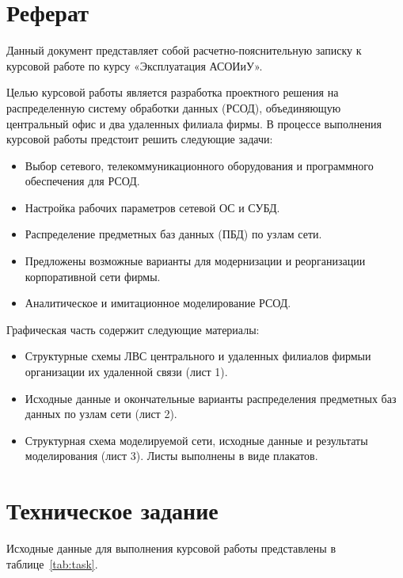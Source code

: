 \documentclass[russian,utf8,emptystyle]{eskdtext}
\begin{document}
\maketitle
%

\section{Реферат}
Данный документ представляет собой расчетно-пояснительную записку к курсовой работе по курсу «Эксплуатация АСОИиУ».

Целью курсовой работы является разработка проектного решения на распределенную систему обработки данных (РСОД), объединяющую центральный офис и два удаленных филиала фирмы. В процессе выполнения курсовой работы предстоит решить следующие задачи:
\begin{itemize}[label=-]
\item Выбор сетевого, телекоммуникационного оборудования и программного обеспечения для РСОД.
\item Настройка рабочих параметров сетевой ОС и СУБД.
\item Распределение предметных баз данных (ПБД) по узлам сети.
\item Предложены возможные варианты для модернизации и реорганизации корпоративной сети фирмы.
\item Аналитическое и имитационное моделирование РСОД.
\end{itemize}

Графическая часть содержит следующие материалы:
\begin{itemize}[label=-]
\item Структурные схемы ЛВС центрального и удаленных филиалов фирмыи организации их удаленной связи (лист 1).
\item Исходные данные и окончательные  варианты распределения предметных баз данных по узлам сети (лист 2).
\item Структурная схема моделируемой сети, исходные данные и результаты моделирования (лист 3).
Листы выполнены в виде плакатов.
\end{itemize}

\clearpage

\tableofcontents
\clearpage

\section{Техническое задание}
Исходные данные для выполнения курсовой работы представлены в таблице~\ref{tab:task}.
\end{document}
